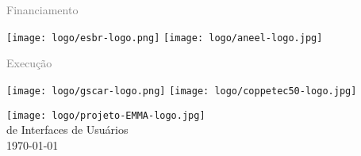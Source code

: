 %
%
%
%
\pagestyle{fancy}%
\thispagestyle{fancy}%
\renewcommand{\headrulewidth}  {0.4pt}%
\renewcommand{\footrulewidth}  {0.4pt}%
%
\chead{}%
\rhead{}%
\lfoot{}%
\cfoot{}%
\rfoot{\sf [\hours] \quad \today}%
\vspace*{20mm}%

{\grande \textcolor{gray}{Financiamento}}

\vspace{-25mm}%
\hspace{50mm}%
\texttt{[image: logo/esbr-logo.png]}
\hspace{10mm}%
\texttt{[image: logo/aneel-logo.jpg]}

\vspace{35mm}%
{\grande \textcolor{gray}{Execução}}

\vspace{-25mm}%
\hspace{50mm}%
\texttt{[image: logo/gscar-logo.png]}
\hspace{10mm}%
\texttt{[image: logo/coppetec50-logo.jpg]}

\vfill%
\begin{center}
  {\GRANDE \raisebox{1.4ex}{} \texttt{[image: logo/projeto-EMMA-logo.jpg]}} \\[10mm]
  { de Interfaces de Usuários} \\[25mm]
  {\large \today}
  \vfill%
\end{center}

\newpage%
\pagestyle{fancy}%
\thispagestyle{fancy}%
\renewcommand{\headrulewidth}  {0.4pt}%
\renewcommand{\footrulewidth}  {0.4pt}%
%
%
\rhead{\sf\thepage}%
%
\cfoot{}%
\rfoot{\sf [\hours] \quad \today}%
